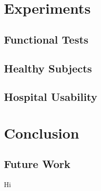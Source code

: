 \documentclass[12pt]{report}
\begin{document}
\section{Experiments}
	\subsection{Functional Tests}
	\subsection{Healthy Subjects}
		
	\subsection{Hospital Usability} 
	
\section{Conclusion}
	\subsection{Future Work}
	Hi
	


\end{document}

